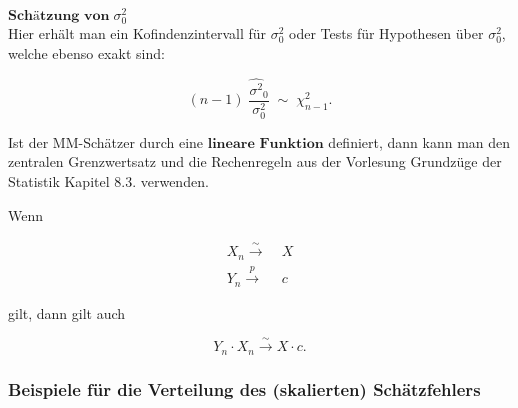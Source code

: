 \documentclass[10pt]{article}
\newcommand{\KW}{\overset{p} \longrightarrow} %
\newcommand{\KV}{\overset{\sim} \longrightarrow} %
\begin{document}
		\noindent $\textbf{Schätzung von} \; \sigma^2_0$\\
	Hier erhält man ein Kofindenzintervall für $\sigma^2_0$ oder Tests für Hypothesen über $\sigma^2_0$, welche ebenso exakt sind:
	
	\begin{equation*}
		(n-1) \; \frac{\hat{\sigma^2}_0}{\sigma^2_0} \; {\sim} \; \chi^2_{n-1}.
	\end{equation*}
	
		\noindent Ist der MM-Schätzer durch eine $\textbf{lineare Funktion}$ definiert, dann kann man den zentralen Grenzwertsatz und die Rechenregeln aus der Vorlesung Grundzüge der Statistik Kapitel 8.3. verwenden. 
	
	\noindent Wenn
	
	\begin{equation*}
		\begin{split}
				X_n \KV& \; X \\
			Y_n \KW& \;c
		\end{split}
	\end{equation*}
	
	\noindent gilt, dann gilt auch
	
	\begin{equation*}
		Y_n \cdot X_n \KV X\cdot c.
	\end{equation*}
	
	
	\subsubsection{Beispiele für die Verteilung des (skalierten) Schätzfehlers}
	
\end{document}
